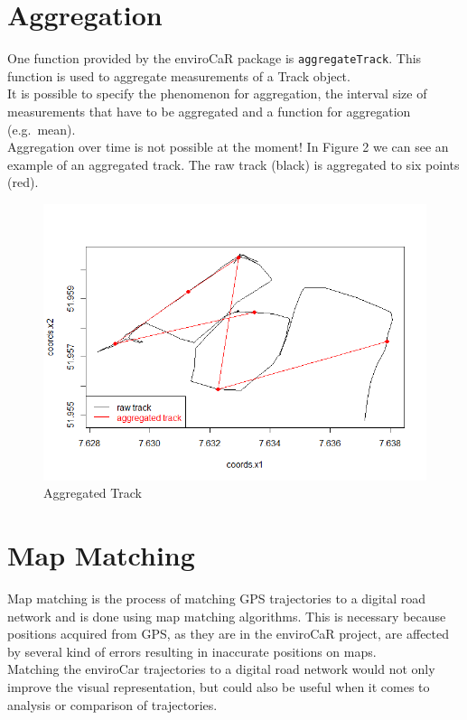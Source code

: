 \documentclass[]{article}
\begin{document}
\section{Aggregation}\label{aggregation}

One function provided by the enviroCaR package is
\texttt{aggregateTrack}. This function is used to aggregate measurements
of a Track object.\\It is possible to specify the phenomenon for
aggregation, the interval size of measurements that have to be
aggregated and a function for aggregation (e.g.~mean).\\Aggregation over
time is not possible at the moment! In Figure 2 we can see an example of
an aggregated track. The raw track (black) is aggregated to six points
(red).

\begin{figure}[htbp]
\centering
\includegraphics{figures/agg.png}
\caption{Aggregated Track}
\end{figure}

\section{Map Matching}\label{map-matching}

Map matching is the process of matching GPS trajectories to a digital
road network and is done using map matching algorithms. This is
necessary because positions acquired from GPS, as they are in the
enviroCaR project, are affected by several kind of errors resulting in
inaccurate positions on maps.\\Matching the enviroCar trajectories to a
digital road network would not only improve the visual representation,
but could also be useful when it comes to analysis or comparison of
trajectories.
\end{document}
